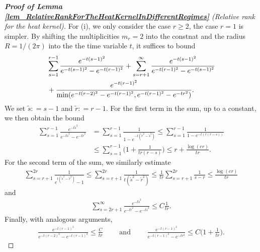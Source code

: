 \documentclass[a4paper,11pt]{article} %
\numberwithin{equation}{section}
\theoremstyle{definition}
\theoremstyle{remark}
\theoremstyle{plain}
\begin{document}
\begin{proof}[\normalfont \textbf{Proof of Lemma \ref{lem_RelativeRankForTheHeatKernelInDifferentRegimes}} (Relative rank for the heat kernel)]
  For (i), we only consider the case $ r \ge 2 $, the case $ r = 1 $ is simpler.
  By shifting the multiplicities \( m_{r} = 2 \) into the constnat and the radius \( R = 1 / (2 \pi) \) into the the time variable \( t \), it suffices to bound
  \begin{align}
    & 
    \sum_{s = 1}^{r - 1} \frac{e^{-t (s-1)^2}}{e^{-t (s-1)^2} - e^{-t (r-1)^2}}
    +
    \sum_{s = r + 1}^{\infty} \frac{e^{-t (s-1)^2}}{e^{-t (r-1)^2} - e^{-t(s-1)^2}}
    \\
    & +
    \frac{e^{-t (r-1)^2}}{\min(e^{-t (r-2)^2} - e^{-t(r-1)^2},e^{-t (r-1)^2} - e^{-t r^2})}.
    \notag 
  \end{align}
  We set \( \tilde s: = s - 1 \) and \( \tilde r: = r - 1 \).
  For the first term in the sum, up to a constant, we then obtain the bound
  \begin{align}
    \sum_{s = 1}^{r - 1} \frac{e^{-t \tilde s^2}}{e^{-t \tilde s^2} - e^{-t \tilde r^2}}
    & = 
    \sum_{s = 1}^{r - 1} \frac{1}{1 - e^{-t (\tilde r^2 - \tilde s^{2} )}}
    \le 
    \sum_{s = 1}^{r - 1} \frac{1}{1 - e^{-t (r (r - s))}}
    \\
    & \le 
    \sum_{s = 1}^{r - 1} \Big( 1 + \frac{1}{t r (r - s)} \Big) 
    \le 
    r + \frac{\log(e r)}{t r}.
  \end{align}
  For the second term of the sum, we similarly estimate
  \begin{align}
    \sum_{s = r + 1}^{2 r} \frac{1}{e^{t (\tilde s^{2} - \tilde r^{2})} - 1} 
    \le 
    \sum_{s = r + 1}^{2 r} \frac{1}{t (\tilde s^{2} - \tilde r^{2})} 
    \le 
    \frac{1}{t r} 
    \sum_{s = r + 1}^{2 r} \frac{1}{s - r} 
    \le 
    \frac{\log(e r)}{t r}
  \end{align}
  and 
  \begin{align}
  \sum_{s = 2 r + 1}^{\infty} \frac{e^{- t \tilde s^{2}}}{e^{- t \tilde r^{2}} - e^{- t \tilde s^{2}}} \le C\frac{1}{t r}.
  \end{align}
  Finally, with analogous arguments,
  \begin{align}\label{eq:iv:1:case}
    \frac{e^{- t (r - 1)^{2}}}{e^{- t (r - 2)^{2}} - e^{- t (r - 1)^{2}}} \le \frac{C}{t r}
    \qquad \text{ and } \qquad 
    \frac{e^{- t (r - 1)^{2}}}{e^{- t (r - 1)^{2}} - e^{- t r^{2}}} \le C \Big( 1 + \frac{1}{t r} \Big) .
  \end{align}


\end{proof}
\end{document}
